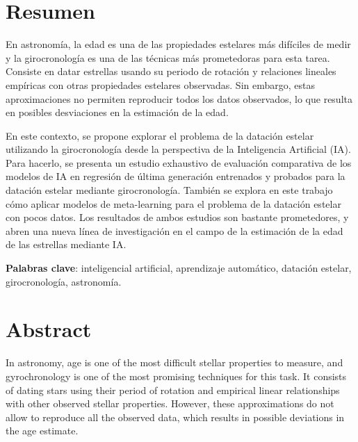 \chapter{Resumen}

\vspace{0.5cm}

En astronomía, la edad es una de las propiedades estelares más difíciles de medir y la girocronología es una de las técnicas más prometedoras para esta tarea. Consiste en datar estrellas usando su periodo de rotación y relaciones lineales empíricas con otras propiedades estelares observadas. Sin embargo, estas aproximaciones no permiten reproducir todos los datos observados, lo que resulta en posibles desviaciones en la estimación de la edad.

En este contexto, se propone explorar el problema de la datación estelar utilizando la girocronología desde la perspectiva de la Inteligencia Artificial (IA). Para hacerlo, se presenta un estudio exhaustivo de evaluación comparativa de los modelos de IA en regresión de última generación entrenados y probados para la datación estelar mediante girocronología. También se explora en este trabajo cómo aplicar modelos de meta-learning para el problema de la datación estelar con pocos datos. Los resultados de ambos estudios son bastante prometedores, y abren una nueva línea de investigación en el campo de la estimación de la edad de las estrellas mediante IA.

\vspace{1cm}

\textbf{Palabras clave}: inteligencial artificial, aprendizaje automático, datación estelar, girocronología, astronomía.


\newpage
\thispagestyle{empty}
\hspace*{0.5cm}
\newpage

\chapter{Abstract}

\vspace{0.5cm}

In astronomy, age is one of the most difficult stellar properties to measure, and gyrochronology is one of the most promising techniques for this task. It consists of dating stars using their period of rotation and empirical linear relationships with other observed stellar properties. However, these approximations do not allow to reproduce all the observed data, which results in possible deviations in the age estimate.

